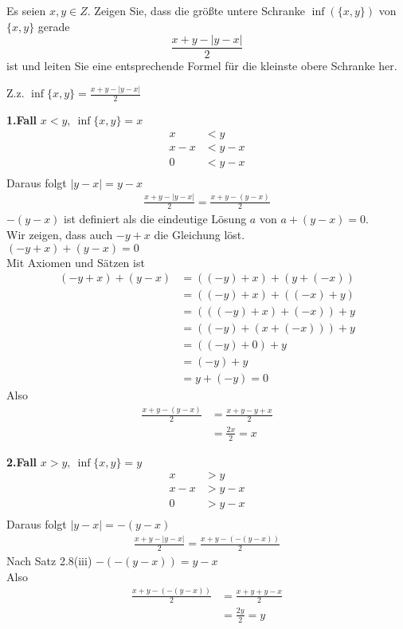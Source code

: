\bigskip


\begin{aufg}[6 Punkte]
Es seien $x,y\in Z$. Zeigen Sie, dass die gr\"o{\ss}te untere Schranke $\inf(\{x,y\})$ von $\{x,y\}$ gerade 
\[
\frac{x+y - |y-x|}{2}
\]
ist und leiten Sie eine entsprechende Formel f\"ur die kleinste obere Schranke her.
\end{aufg}


\bigskip

\begin{lsg}
Z.z. $\inf\{x,y\}=\frac{x+y-|y-x|}{2}$ 

\noindent
\textbf{1.Fall} 
$x<y, \ \inf\{x,y\}=x$
\begin{align*}
    x&<y \\
    x-x&<y-x \\
    0&<y-x \\
\end{align*}
Daraus folgt $|y-x|=y-x$
\begin{align*}
    \frac{x+y-|y-x|}{2}=\frac{x+y-(y-x)}{2}
\end{align*}
$-(y-x)$ ist definiert als die eindeutige Lösung $a$ von $a+(y-x)=0$. \\
Wir zeigen, dass auch $-y+x$ die Gleichung löst.\\
$(-y+x)+(y-x)=0$\\
Mit Axiomen und Sätzen ist
\begin{align*}
    (-y+x)+(y-x)&=((-y)+x)+(y+(-x))\\
    &=((-y)+x)+((-x)+y)\\
    &=(((-y)+x)+(-x))+y\\
    &=((-y)+(x+(-x)))+y\\
    &=((-y)+0)+y\\
    &=(-y)+y\\
    &=y+(-y)=0
\end{align*}
Also
\begin{align*}
    \frac{x+y-(y-x)}{2}&=\frac{x+y-y+x}{2}\\
    &=\frac{2x}{2}=x
\end{align*}

\noindent
\textbf{2.Fall} 
$x>y, \ \inf\{x,y\}=y$
\begin{align*}
    x&>y \\
    x-x&>y-x \\
    0&>y-x \\
\end{align*}
Daraus folgt $|y-x|=-(y-x)$
\begin{align*}
    \frac{x+y-|y-x|}{2}=\frac{x+y-(-(y-x))}{2}
\end{align*}
Nach Satz 2.8(iii) $-(-(y-x))=y-x$\\
Also
\begin{align*}
    \frac{x+y-(-(y-x))}{2}&=\frac{x+y+y-x}{2}\\
    &=\frac{2y}{2}=y
\end{align*}


\end{lsg}
